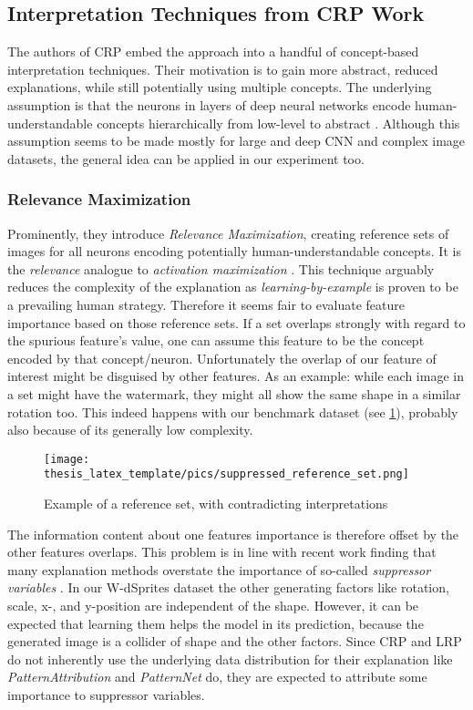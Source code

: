 {\color{gray}
\subsection{Interpretation Techniques from CRP Work}
The authors of CRP embed the approach into a handful of concept-based interpretation techniques. Their motivation is to gain more abstract, reduced explanations, while still potentially using multiple concepts. The underlying assumption is that the neurons in layers of deep neural networks encode human-understandable concepts hierarchically from low-level to abstract \cite{Zeiler2013,Bau2017,Olah2017}. Although this assumption seems to be made mostly for large and deep CNN and complex image datasets, the general idea can be applied in our experiment too. 

\subsubsection{Relevance Maximization}
Prominently, they introduce \textit{Relevance Maximization}, creating reference sets of images for all neurons encoding potentially human-understandable concepts. It is the \textit{relevance} analogue to \textit{activation maximization} \cite{Nguyen2016}. This technique arguably reduces the complexity of the explanation as \textit{learning-by-example} is proven to be a prevailing human strategy.
Therefore it seems fair to evaluate feature importance based on those reference sets. If a set overlaps strongly with regard to the spurious feature's value, one can assume this feature to be the concept encoded by that concept/neuron. 
Unfortunately the overlap of our feature of interest might be disguised by other features. As an example: while each image in a set might have the watermark, they might all show the same shape in a similar rotation too. This indeed happens with our benchmark dataset (see \cref{fig:suppressor_ref}), probably also because of its generally low complexity. 

\begin{figure}
    \centering
    \texttt{[image: thesis\_latex\_template/pics/suppressed\_reference\_set.png]}
    \caption{Example of a reference set, with contradicting interpretations}
    \label{fig:suppressor_ref}
\end{figure}

The information content about one features importance is therefore offset by the other features overlaps. This problem is in line with recent work finding that many explanation methods overstate the importance of so-called \textit{suppressor variables} \cite{Wilming2023,Clark2023}. In our W-dSprites dataset the other generating factors like rotation, scale, x-, and y-position are independent of the shape. However, it can be expected that learning them helps the model in its prediction, because the generated image is a collider of shape and the other factors. Since CRP and LRP do not inherently use the underlying data distribution for their explanation like \textit{PatternAttribution} and \textit{PatternNet} do, they are expected to attribute some importance to suppressor variables. \\

}

